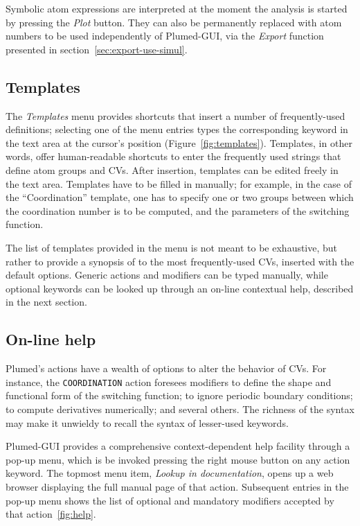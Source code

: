 \documentclass[preprint,review,11pt]{elsarticle}
\begin{document}
Symbolic atom expressions are interpreted at the moment the analysis is
started by pressing the \emph{Plot} button. They can also be
permanently replaced with atom numbers to be used independently of Plumed-GUI, via the
\emph{Export} function presented in section~\ref{sec:export-use-simul}.



\subsection{Templates}

The \emph{Templates} menu provides shortcuts that insert a number of
frequently-used definitions; selecting one of the menu entries types
the corresponding keyword in the text area at the cursor's position
(Figure~\ref{fig:templates}). Templates, in other words, offer
human-readable shortcuts to enter the frequently used strings that
define atom groups and CVs. After insertion, templates can be edited
freely in the text area.
Templates have to be filled in  manually; for example, in the
case of the ``Coordination'' template, one has to specify one or two
groups between which the coordination number is to be computed, and
the parameters of the switching function.

The list of templates provided in the menu is not meant to be
exhaustive, but rather to provide a synopsis of to the most
frequently-used CVs, inserted with the default options. Generic
actions and modifiers can be typed manually, while optional keywords
can be looked up through an on-line contextual help, described
in the next section.


\subsection{On-line help}

Plumed's actions have a wealth of options to alter the
behavior of CVs. For instance, the \texttt{COORDINATION} action
foresees modifiers to define the shape and functional form of the
switching function; to ignore periodic boundary conditions; to compute
derivatives numerically; and several others. The richness of the
syntax may make it unwieldy to recall the syntax of lesser-used
keywords.


Plumed-GUI provides a comprehensive context-dependent help facility
through a pop-up menu, which is be invoked pressing the right mouse
button on any action keyword. The topmost menu item, \emph{Lookup in
  documentation}, opens up a web browser displaying the full manual
page of that action.  Subsequent entries in the pop-up menu shows the
list of optional and mandatory modifiers accepted by that
action~\ref{fig:help}.
\end{document}
